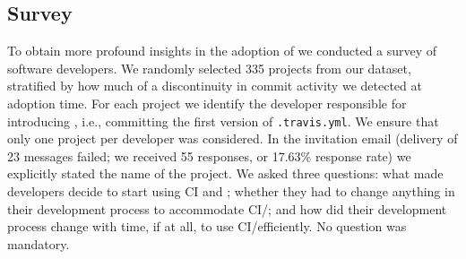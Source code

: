 
\subsection{Survey}
To obtain more profound insights in the adoption of \Tvis we conducted a survey 
of software developers.
We randomly selected 335 projects from our dataset, stratified by how much of a
discontinuity in commit activity we detected at \Tvi adoption time.
For each project we identify the developer responsible for introducing \Tvi, 
i.e., committing the first version of \texttt{.travis.yml}. 
We ensure that only one project per developer was considered.
In the invitation email (delivery of 23 messages failed; we received 55 responses,
or 17.63\% response rate) we explicitly stated the name of the project.
We asked three questions: what made developers decide to start using CI and 
\Tvis; whether they had to change anything in their development process to 
accommodate CI/\Tvi; and how did their development process change with time,
if at all, to use CI/\Tvis efficiently.
No question was mandatory.





